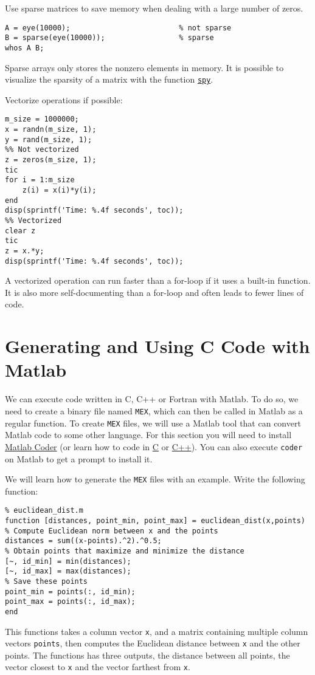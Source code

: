 \documentclass[12pt, a4paper]{article}
\begin{document}
Use sparse matrices to save memory when dealing with a large number of zeros.
\lstset{language=matlab,label= ,caption= ,captionpos=b,firstnumber=1,numbers=left,style=Matlab-editor}
\begin{lstlisting}
A = eye(10000);                         % not sparse
B = sparse(eye(10000));                 % sparse
whos A B;
\end{lstlisting}
Sparse arrays only stores the nonzero elements in memory.
It is possible to visualize the sparsity of a matrix with the function \href{https://www.mathworks.com/help/matlab/ref/spy.html?s\_tid=doc\_ta}{\texttt{spy}}.

Vectorize operations if possible:
\lstset{language=matlab,label= ,caption= ,captionpos=b,firstnumber=1,numbers=left,style=Matlab-editor}
\begin{lstlisting}
m_size = 1000000;
x = randn(m_size, 1);
y = rand(m_size, 1);
%% Not vectorized
z = zeros(m_size, 1);
tic
for i = 1:m_size
    z(i) = x(i)*y(i);
end
disp(sprintf('Time: %.4f seconds', toc));
%% Vectorized
clear z
tic
z = x.*y;
disp(sprintf('Time: %.4f seconds', toc));
\end{lstlisting}
A vectorized operation can run faster than a for-loop if it uses a built-in function.
It is also more self-documenting than a for-loop and often leads to fewer lines of code.
\section{Generating and Using C Code with Matlab}
\label{sec:org2beb8b0}
We can execute code written in C, C++ or Fortran with Matlab.
To do so, we need to create a binary file named \texttt{MEX}, which can then be called in Matlab as a regular function.
To create \texttt{MEX} files, we will use a Matlab tool that can convert Matlab code to some other language.
For this section you will need to install \href{https://www.mathworks.com/help/coder/index.html?s\_tid=CRUX\_lftnav}{Matlab Coder} (or learn how to code in \href{https://en.wikipedia.org/wiki/C\_(programming\_language)}{C} or \href{https://en.wikipedia.org/wiki/C\%2B\%2B}{C++}).
You can also execute \texttt{coder} on Matlab to get a prompt to install it.

We will learn how to generate the \texttt{MEX} files with an example.
Write the following function:
\lstset{language=matlab,label= ,caption= ,captionpos=b,firstnumber=1,numbers=left,style=Matlab-editor}
\begin{lstlisting}
% euclidean_dist.m
function [distances, point_min, point_max] = euclidean_dist(x,points)
% Compute Euclidean norm between x and the points
distances = sum((x-points).^2).^0.5;
% Obtain points that maximize and minimize the distance
[~, id_min] = min(distances);
[~, id_max] = max(distances);
% Save these points
point_min = points(:, id_min);
point_max = points(:, id_max);
end
\end{lstlisting}
This functions takes a column vector \texttt{x}, and a matrix containing multiple column vectors \texttt{points}, then computes the Euclidean distance between \texttt{x} and the other points.
The functions has three outputs, the distance between all points, the vector closest to \texttt{x} and the vector farthest from \texttt{x}.
\end{document}

